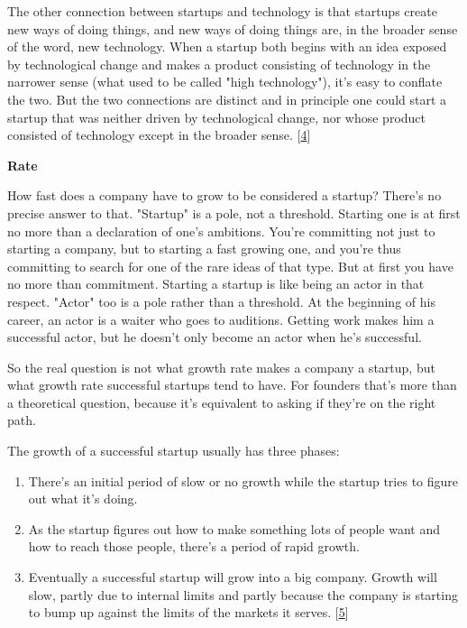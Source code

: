 The other connection between startups and technology is that startups
create new ways of doing things, and new ways of doing things are,
in the broader sense of the word, new technology.  
When a startup both begins with an
idea exposed by technological change and makes a product consisting
of technology in the narrower sense (what used to be called "high
technology"), it's easy to conflate the two.  But the two connections
are distinct and in principle one could start a startup that was
neither driven by technological change, nor whose product consisted
of technology except in the broader sense. 
[\href{\#f4n}{4}]

\textbf{Rate}

How fast does a company have to grow to be considered a startup?
There's no precise answer to that.  "Startup" is a pole, not a
threshold.  Starting one is at first no more than a declaration of
one's ambitions.  You're committing not just to starting a company,
but to starting a fast growing one, and you're thus committing to
search for one of the rare ideas of that type.  But at first you
have no more than commitment.  Starting a startup is like being an
actor in that respect.  "Actor" too is a pole rather than a threshold.
At the beginning of his career, an actor is a waiter who goes to
auditions.  Getting work makes him a successful actor, but he doesn't
only become an actor when he's successful.

So the real question is not what growth rate makes a company a
startup, but what growth rate successful startups tend to have.
For founders that's more than a theoretical question, because it's
equivalent to asking if they're on the right path.

The growth of a successful startup usually has three phases:

\begin{enumerate}
\item  There's an initial period of slow or no growth while the startup
  tries to figure out what it's doing.


\item  As the startup figures out how to make something lots of people
  want and how to reach those people, there's a period of rapid
  growth.


\item  Eventually a successful startup will grow into a big company.
  Growth will slow, partly due to internal limits and partly because
  the company is starting to bump up against the limits of the
  markets it serves.  
  [\href{\#f5n}{5}]

\end{enumerate}

